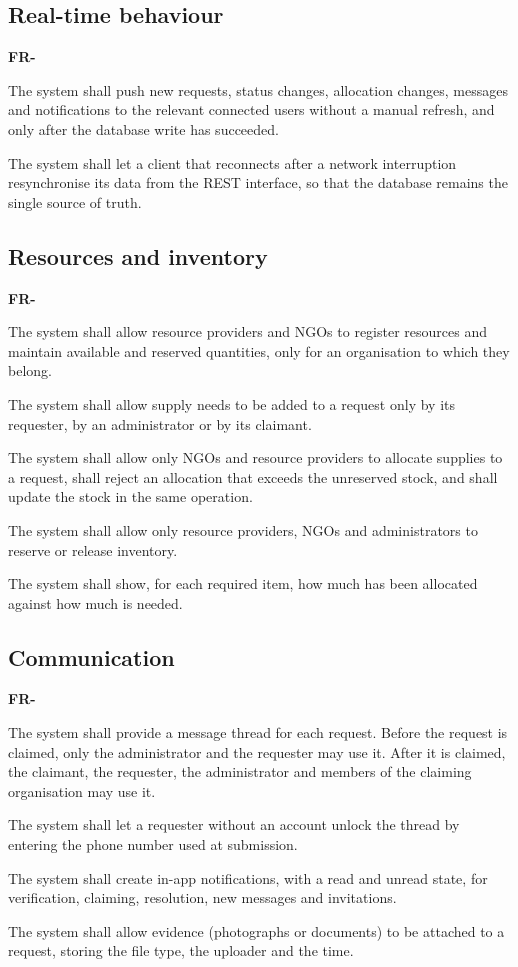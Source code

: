 \documentclass{scrreprt}
\newcounter{fr}
\newcounter{frsave}
\newenvironment{frlist}
  {\begin{list}{\textbf{FR-\arabic{fr}}}{\usecounter{fr}\setcounter{fr}{\value{frsave}}%
   \setlength{\labelwidth}{1.5cm}\setlength{\leftmargin}{1.8cm}%
   \setlength{\itemsep}{3pt}\setlength{\parsep}{2pt}}}
  {\setcounter{frsave}{\value{fr}}\end{list}}
\begin{document}
\subsection*{Real-time behaviour}
\begin{frlist}
    \item The system shall push new requests, status changes, allocation changes, messages and notifications to the relevant connected users without a manual refresh, and only after the database write has succeeded.
    \item The system shall let a client that reconnects after a network interruption resynchronise its data from the REST interface, so that the database remains the single source of truth.
\end{frlist}

\subsection*{Resources and inventory}
\begin{frlist}
    \item The system shall allow resource providers and NGOs to register resources and maintain available and reserved quantities, only for an organisation to which they belong.
    \item The system shall allow supply needs to be added to a request only by its requester, by an administrator or by its claimant.
    \item The system shall allow only NGOs and resource providers to allocate supplies to a request, shall reject an allocation that exceeds the unreserved stock, and shall update the stock in the same operation.
    \item The system shall allow only resource providers, NGOs and administrators to reserve or release inventory.
    \item The system shall show, for each required item, how much has been allocated against how much is needed.
\end{frlist}

\subsection*{Communication}
\begin{frlist}
    \item The system shall provide a message thread for each request. Before the request is claimed, only the administrator and the requester may use it. After it is claimed, the claimant, the requester, the administrator and members of the claiming organisation may use it.
    \item The system shall let a requester without an account unlock the thread by entering the phone number used at submission.
    \item The system shall create in-app notifications, with a read and unread state, for verification, claiming, resolution, new messages and invitations.
    \item The system shall allow evidence (photographs or documents) to be attached to a request, storing the file type, the uploader and the time.
\end{frlist}
\end{document}
